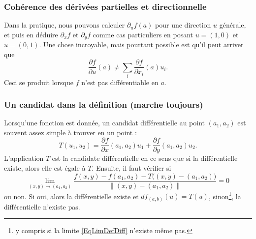 \subsubsection{Cohérence des dérivées partielles et directionnelle}

Dans la pratique, nous pouvons calculer \( \partial_uf(a)\) pour une direction \( u\) générale, et puis en déduire \( \partial_xf\) et \( \partial_yf\) comme cas particuliers en posant \( u=(1,0)\) et \( u=(0,1)\). Une chose incroyable, mais pourtant possible est qu'il peut arriver que
\begin{equation}
	\frac{ \partial f }{ \partial u }(a)\neq \sum_i\frac{ \partial f }{ \partial x_i }(a)u_i.
\end{equation}
Ceci se produit lorsque \( f\) n'est pas différentiable en \( a\).

\subsubsection{Un candidat dans la définition (marche toujours)}

Lorsqu'une fonction est donnée, un candidat différentielle au point \( (a_1,a_2)\) est souvent assez simple à trouver en un point :
\begin{equation}
	T(u_1,u_2)=\frac{ \partial f }{ \partial x }(a_1,a_2)u_1+\frac{ \partial f }{ \partial y }(a_1,a_2)u_2.
\end{equation}
L'application \( T\) est la candidate différentielle en ce sens que si la différentielle existe, alors elle est égale à \( T\). Ensuite, il faut vérifier si
\begin{equation}        \label{EqLimDefDiff}
	\lim_{(x,y)\to (a_1,a_2)} \frac{f(x,y) - f(a_1,a_2) - T\big( (x,y)-(a_1,a_2) \big)}{\| (x,y)-(a_1,a_2) \|}=0
\end{equation}
ou non. Si oui, alors la différentielle existe et \( df_{(a,b)}(u)=T(u)\), sinon\footnote{y compris si la limite \eqref{EqLimDefDiff} n'existe même pas.}, la différentielle n'existe pas.

